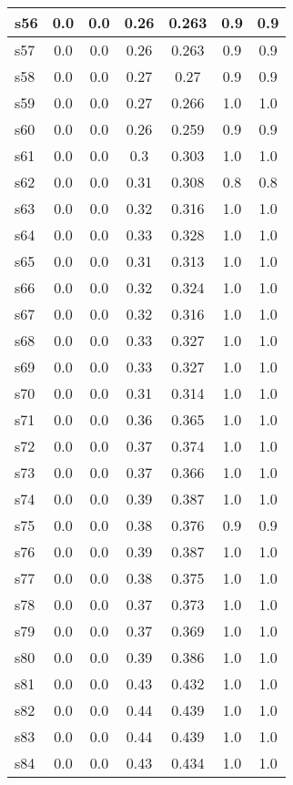 \documentclass{article}
\begin{document}
\begin{tabular}{|l|c|c|c|c|c|c|}
\hline
s56 &0.0 & 0.0 & 0.26 & 0.263 & 0.9 & 0.9\\
\hline
s57 &0.0 & 0.0 & 0.26 & 0.263 & 0.9 & 0.9\\
\hline
s58 &0.0 & 0.0 & 0.27 & 0.27 & 0.9 & 0.9\\
\hline
s59 &0.0 & 0.0 & 0.27 & 0.266 & 1.0 & 1.0\\
\hline
s60 &0.0 & 0.0 & 0.26 & 0.259 & 0.9 & 0.9\\
\hline
s61 &0.0 & 0.0 & 0.3 & 0.303 & 1.0 & 1.0\\
\hline
s62 &0.0 & 0.0 & 0.31 & 0.308 & 0.8 & 0.8\\
\hline
s63 &0.0 & 0.0 & 0.32 & 0.316 & 1.0 & 1.0\\
\hline
s64 &0.0 & 0.0 & 0.33 & 0.328 & 1.0 & 1.0\\
\hline
s65 &0.0 & 0.0 & 0.31 & 0.313 & 1.0 & 1.0\\
\hline
s66 &0.0 & 0.0 & 0.32 & 0.324 & 1.0 & 1.0\\
\hline
s67 &0.0 & 0.0 & 0.32 & 0.316 & 1.0 & 1.0\\
\hline
s68 &0.0 & 0.0 & 0.33 & 0.327 & 1.0 & 1.0\\
\hline
s69 &0.0 & 0.0 & 0.33 & 0.327 & 1.0 & 1.0\\
\hline
s70 &0.0 & 0.0 & 0.31 & 0.314 & 1.0 & 1.0\\
\hline
s71 &0.0 & 0.0 & 0.36 & 0.365 & 1.0 & 1.0\\
\hline
s72 &0.0 & 0.0 & 0.37 & 0.374 & 1.0 & 1.0\\
\hline
s73 &0.0 & 0.0 & 0.37 & 0.366 & 1.0 & 1.0\\
\hline
s74 &0.0 & 0.0 & 0.39 & 0.387 & 1.0 & 1.0\\
\hline
s75 &0.0 & 0.0 & 0.38 & 0.376 & 0.9 & 0.9\\
\hline
s76 &0.0 & 0.0 & 0.39 & 0.387 & 1.0 & 1.0\\
\hline
s77 &0.0 & 0.0 & 0.38 & 0.375 & 1.0 & 1.0\\
\hline
s78 &0.0 & 0.0 & 0.37 & 0.373 & 1.0 & 1.0\\
\hline
s79 &0.0 & 0.0 & 0.37 & 0.369 & 1.0 & 1.0\\
\hline
s80 &0.0 & 0.0 & 0.39 & 0.386 & 1.0 & 1.0\\
\hline
s81 &0.0 & 0.0 & 0.43 & 0.432 & 1.0 & 1.0\\
\hline
s82 &0.0 & 0.0 & 0.44 & 0.439 & 1.0 & 1.0\\
\hline
s83 &0.0 & 0.0 & 0.44 & 0.439 & 1.0 & 1.0\\
\hline
s84 &0.0 & 0.0 & 0.43 & 0.434 & 1.0 & 1.0\\

\end{tabular}
\end{document}

